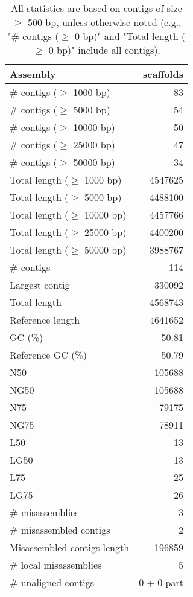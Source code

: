 \documentclass[12pt,a4paper]{article}
\begin{document}
\begin{table}[ht]
\begin{center}
\caption{All statistics are based on contigs of size $\geq$ 500 bp, unless otherwise noted (e.g., "\# contigs ($\geq$ 0 bp)" and "Total length ($\geq$ 0 bp)" include all contigs).}
\begin{tabular}{|l*{1}{|r}|}
\hline
Assembly & scaffolds \\ \hline
\# contigs ($\geq$ 1000 bp) & 83 \\ \hline
\# contigs ($\geq$ 5000 bp) & 54 \\ \hline
\# contigs ($\geq$ 10000 bp) & 50 \\ \hline
\# contigs ($\geq$ 25000 bp) & 47 \\ \hline
\# contigs ($\geq$ 50000 bp) & 34 \\ \hline
Total length ($\geq$ 1000 bp) & 4547625 \\ \hline
Total length ($\geq$ 5000 bp) & 4488100 \\ \hline
Total length ($\geq$ 10000 bp) & 4457766 \\ \hline
Total length ($\geq$ 25000 bp) & 4400200 \\ \hline
Total length ($\geq$ 50000 bp) & 3988767 \\ \hline
\# contigs & 114 \\ \hline
Largest contig & 330092 \\ \hline
Total length & 4568743 \\ \hline
Reference length & 4641652 \\ \hline
GC (\%) & 50.81 \\ \hline
Reference GC (\%) & 50.79 \\ \hline
N50 & 105688 \\ \hline
NG50 & 105688 \\ \hline
N75 & 79175 \\ \hline
NG75 & 78911 \\ \hline
L50 & 13 \\ \hline
LG50 & 13 \\ \hline
L75 & 25 \\ \hline
LG75 & 26 \\ \hline
\# misassemblies & 3 \\ \hline
\# misassembled contigs & 2 \\ \hline
Misassembled contigs length & 196859 \\ \hline
\# local misassemblies & 5 \\ \hline
\# unaligned contigs & 0 + 0 part \\ \hline

\end{tabular}
\end{center}
\end{table}
\end{document}
